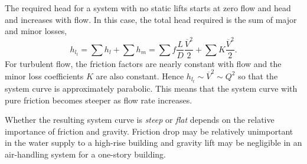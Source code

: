 The required head for a system with no static lifts starts at zero flow and head and increases with flow.
In this case, the total head required is the sum of major and minor losses,
\begin{equation*}
  h_{l_t} = \sum h_l + \sum h_m  = \sum f \frac{L}{D} \frac{\overline{V}^2}{2} + \sum K \frac{\overline{V}^2}{2}
.\end{equation*}
For turbulent flow, the friction factors are nearly constant with flow and the minor loss coefficients $K$ are also constant.
Hence $h_{l_t} \sim \overline{V}^2 \sim Q^2$ so that the system curve is approximately parabolic.
This means that the system curve with pure friction becomes steeper as flow rate increases.

Whether the resulting system curve is \textit{steep} or \textit{flat} depends on the relative importance of friction and gravity.
Friction drop may be relatively unimportant in the water supply to a high-rise building and gravity lift may be negligible in an air-handling system for a one-story building.

